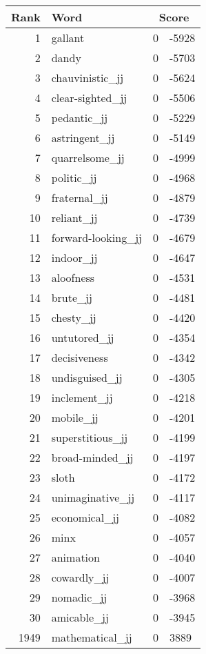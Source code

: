 \begin{longtable}[!htbp]{| rlr@{.}l |}
    \hline
    \textbf{Rank} & \textbf{Word} & \multicolumn{2}{c|}{\textbf{Score}} \\
    \hline
    \endhead
    1 & gallant & 0 & -5928 \\
    2 & dandy & 0 & -5703 \\
    3 & chauvinistic\_jj & 0 & -5624 \\
    4 & clear-sighted\_jj & 0 & -5506 \\
    5 & pedantic\_jj & 0 & -5229 \\
    6 & astringent\_jj & 0 & -5149 \\
    7 & quarrelsome\_jj & 0 & -4999 \\
    8 & politic\_jj & 0 & -4968 \\
    9 & fraternal\_jj & 0 & -4879 \\
    10 & reliant\_jj & 0 & -4739 \\
    11 & forward-looking\_jj & 0 & -4679 \\
    12 & indoor\_jj & 0 & -4647 \\
    13 & aloofness & 0 & -4531 \\
    14 & brute\_jj & 0 & -4481 \\
    15 & chesty\_jj & 0 & -4420 \\
    16 & untutored\_jj & 0 & -4354 \\
    17 & decisiveness & 0 & -4342 \\
    18 & undisguised\_jj & 0 & -4305 \\
    19 & inclement\_jj & 0 & -4218 \\
    20 & mobile\_jj & 0 & -4201 \\
    21 & superstitious\_jj & 0 & -4199 \\
    22 & broad-minded\_jj & 0 & -4197 \\
    23 & sloth & 0 & -4172 \\
    24 & unimaginative\_jj & 0 & -4117 \\
    25 & economical\_jj & 0 & -4082 \\
    26 & minx & 0 & -4057 \\
    27 & animation & 0 & -4040 \\
    28 & cowardly\_jj & 0 & -4007 \\
    29 & nomadic\_jj & 0 & -3968 \\
    30 & amicable\_jj & 0 & -3945 \\
    1949 & mathematical\_jj & 0 & 3889 \\

\end{longtable}
